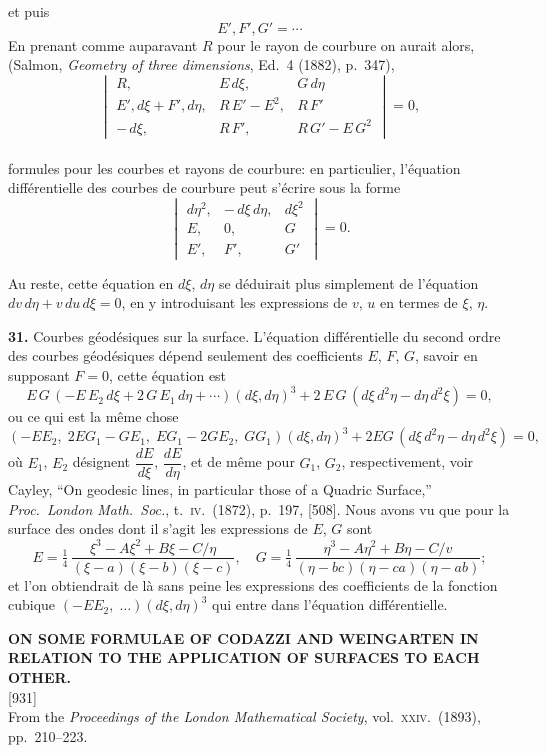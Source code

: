 \documentclass[11pt,a4paper]{article}
\newcommand{\paper}[3]{%
  \clearpage
  \begin{center}
    {\large\bfseries #2}\\[0.5em]
    {\small [#1]}\\[0.3em]
    {\small #3}
  \end{center}
  \vspace{0.5em}
}
\begin{document}
et puis
\[
E', F', G' = \cdots
\]
En prenant comme auparavant $R$ pour le rayon de courbure on aurait alors, (Salmon, \textit{Geometry of three dimensions}, Ed.\ 4 (1882), p.\ 347),
\[
\begin{vmatrix}
R, & E\,d\xi, & G\,d\eta \\
E'\!,d\xi + F'\!,d\eta, & R\,E' - E^2, & R\,F' \\
-\,d\xi, & R\,F', & R\,G' - E\,G^2
\end{vmatrix} = 0,
\]
\\
\noindent formules pour les courbes et rayons de courbure: en particulier, l'\'equation diff\'erentielle des courbes de courbure peut s'\'ecrire sous la forme
\[
\begin{vmatrix}
d\eta^2, & -\,d\xi\,d\eta, & d\xi^2 \\
E, & 0, & G \\
E', & F', & G'
\end{vmatrix} = 0.
\]

Au reste, cette \'equation en $d\xi$, $d\eta$ se d\'eduirait plus simplement de l'\'equation $dv\,d\eta + v\,du\,d\xi = 0$, en y introduisant les expressions de $v$, $u$ en termes de $\xi$, $\eta$.

\textbf{31.} Courbes g\'eod\'esiques sur la surface. L'\'equation diff\'erentielle du second ordre des courbes g\'eod\'esiques d\'epend seulement des coefficients $E$, $F$, $G$, savoir en supposant $F = 0$, cette \'equation est
\[
E\,G\,(- E\,E_2\,d\xi + 2\,G\,E_1\,d\eta + \cdots)(d\xi, d\eta)^3 + 2\,E\,G\,(d\xi\,d^2\eta - d\eta\,d^2\xi) = 0,
\]
ou ce qui est la m\^eme chose
\[
(- E E_2,\; 2 E G_1 - G E_1,\; E G_1 - 2 G E_2,\; G G_1)(d\xi, d\eta)^3 + 2 E G\,(d\xi\,d^2\eta - d\eta\,d^2\xi) = 0,
\]
o\`u $E_1$, $E_2$ d\'esignent $\dfrac{dE}{d\xi}$, $\dfrac{dE}{d\eta}$, et de m\^eme pour $G_1$, $G_2$, respectivement,
voir Cayley, ``On geodesic lines, in particular those of a Quadric Surface,'' \textit{Proc.\ London Math.\ Soc.}, t.\ \textsc{iv}.\ (1872), p.\ 197, [508]. Nous avons vu que pour la surface des ondes dont il s'agit les expressions de $E$, $G$ sont
\[
E = \tfrac{1}{4}\,\frac{\xi^3 - A\xi^2 + B\xi - C/\eta}{(\xi - a)(\xi - b)(\xi - c)},\quad G = \tfrac{1}{4}\,\frac{\eta^3 - A\eta^2 + B\eta - C/v}{(\eta - bc)(\eta - ca)(\eta - ab)};
\]
et l'on obtiendrait de l\`a sans peine les expressions des coefficients de la fonction cubique $(- E E_2,\;\ldots)(d\xi,d\eta)^3$ qui entre dans l'\'equation diff\'erentielle.

\paper{931}{ON SOME FORMULAE OF CODAZZI AND WEINGARTEN IN RELATION TO THE APPLICATION OF SURFACES TO EACH OTHER.}{From the \textit{Proceedings of the London Mathematical Society}, vol.\ \textsc{xxiv}.\ (1893), pp.\ 210--223.}
\end{document}
